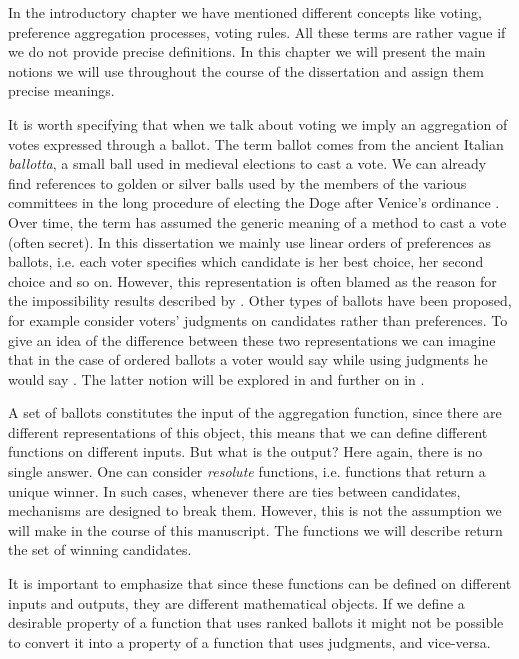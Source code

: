 In the introductory chapter we have mentioned different concepts like voting, preference aggregation processes, voting rules. All these terms are rather vague if we do not provide precise definitions.
In this chapter we will present the main notions we will use throughout the course of the dissertation and assign them precise meanings.

It is worth specifying that when we talk about voting we imply an aggregation of votes expressed through a ballot. The term ballot comes from the ancient Italian \textit{ballotta}, a small ball used in medieval elections to cast a vote.
We can already find references to golden or silver balls used by the members of the various committees in the long procedure of electing the Doge after Venice's ordinance \citep{Doglioni1666}.
Over time, the term has assumed the generic meaning of a method to cast a vote (often secret).
In this dissertation we mainly use linear orders of preferences as ballots, i.e. each voter specifies which candidate is her best choice, her second choice and so on. However, this representation is often blamed as the reason for the impossibility results described by \citet{Arrow1950}. 
Other types of ballots have been proposed, for example \citet{Balinski2011} consider voters' judgments on candidates rather than preferences. 
To give an idea of the difference between these two representations we can imagine that in the case of ordered ballots a voter would say  while using judgments he would say .
The latter notion will be explored in  and further on in .

A set of ballots constitutes the input of the aggregation function, since there are different representations of this object, this means that we can define different functions on different inputs. But what is the output?
Here again, there is no single answer. One can consider \textit{resolute} functions, i.e. functions that return a unique winner. In such cases, whenever there are ties between candidates, mechanisms are designed to break them.
However, this is not the assumption we will make in the course of this manuscript. The functions we will describe return the set of winning candidates.

It is important to emphasize that since these functions can be defined on different inputs and outputs, they are different mathematical objects. If we define a desirable property of a function that uses ranked ballots it might not be possible to convert it into a property of a function that uses judgments, and vice-versa.

